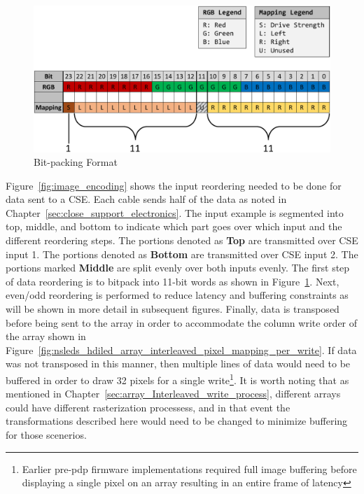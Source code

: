     \begin{figure}
        \centering
        \includegraphics[width=1.0\textwidth]{fig/bit_packing.pdf}
        \caption{Bit-packing Format}
        \label{fig:bit_packing}
    \end{figure}

    Figure~\ref{fig:image_encoding} shows the input reordering needed to be done for data sent to a CSE. Each cable sends half of the data as noted in Chapter~\ref{sec:close_support_electronics}. The input example is segmented into top, middle, and bottom to indicate which part goes over which input and the different reordering steps. The portions denoted as \textbf{Top} are transmitted over CSE input 1. The portions denoted as \textbf{Bottom} are transmitted over CSE input 2. The portions marked \textbf{Middle} are split evenly over both inputs evenly. The first step of data reordering is to bitpack into 11-bit words as shown in Figure~\ref{fig:bit_packing}. Next, even/odd reordering is performed to reduce latency and buffering constraints as will be shown in more detail in subsequent figures. Finally, data is transposed before being sent to the array in order to accommodate the column write order of the array shown in Figure~\ref{fig:nsleds_hdiled_array_interleaved_pixel_mapping_per_write}. If data was not transposed in this manner, then multiple lines of data would need to be buffered in order to draw 32 pixels for a single write\footnote{Earlier pre-pdp firmware implementations required full image buffering before displaying a single pixel on an array resulting in an entire frame of latency}. It is worth noting that as mentioned in Chapter~\ref{sec:array_Interleaved_write_process}, different arrays could have different rasterization processess, and in that event the transformations described here would need to be changed to minimize buffering for those scenerios.


